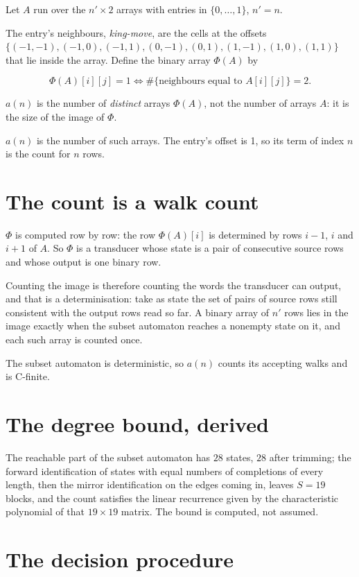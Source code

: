 \documentclass[11pt]{article}
\theoremstyle{definition}
\begin{document}
Let $A$ run over the $n' \times 2$ arrays with entries in $\{0,\dots,1\}$, $n' = n$.

The entry's neighbours, {\itshape king-move}, are the cells at the offsets $\{(-1,-1), (-1,0), (-1,1), (0,-1), (0,1), (1,-1), (1,0), (1,1)\}$ that lie inside the array. Define the binary array $\Phi(A)$ by

\[\Phi(A)[i][j] = 1 \iff \#\{\text{neighbours equal to } A[i][j]\} = 2.\]

$a(n)$ is the number of {\itshape distinct} arrays $\Phi(A)$, not the number of arrays $A$: it is the size of the image of $\Phi$.

$a(n)$ is the number of such arrays. The entry's offset is 1, so its term of index $n$ is the count for $n$ rows.

\section{The count is a walk count}

$\Phi$ is computed row by row: the row $\Phi(A)[i]$ is determined by rows $i-1$, $i$ and $i+1$ of $A$. So $\Phi$ is a transducer whose state is a pair of consecutive source rows and whose output is one binary row.

Counting the image is therefore counting the words the transducer can output, and that is a determinisation: take as state the set of pairs of source rows still consistent with the output rows read so far. A binary array of $n'$ rows lies in the image exactly when the subset automaton reaches a nonempty state on it, and each such array is counted once.

The subset automaton is deterministic, so $a(n)$ counts its accepting walks and is C-finite.

\section{The degree bound, derived}

The reachable part of the subset automaton has $28$ states, $28$ after trimming; the forward identification of states with equal numbers of completions of every length, then the mirror identification on the edges coming in, leaves $S = 19$ blocks, and the count satisfies the linear recurrence given by the characteristic polynomial of that $19\times19$ matrix. The bound is computed, not assumed.

\section{The decision procedure}
\end{document}
